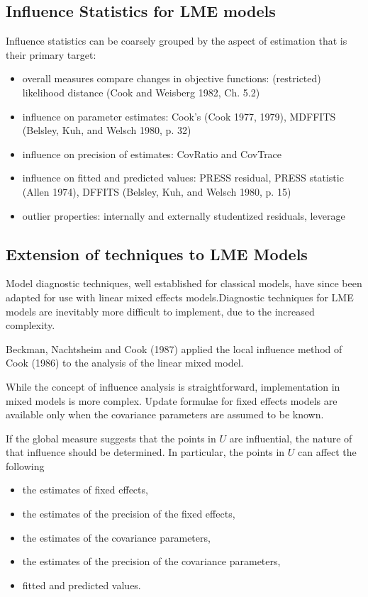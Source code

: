 \documentclass[Main.tex]{subfiles}
\begin{document}
	\subsection{Influence Statistics for LME models} %
	Influence statistics can be coarsely grouped by the aspect of estimation that is their primary target:
	\begin{itemize}
		\item overall measures compare changes in objective functions: (restricted) likelihood distance (Cook and Weisberg 1982, Ch. 5.2)
		\item influence on parameter estimates: Cook's  (Cook 1977, 1979), MDFFITS (Belsley, Kuh, and Welsch 1980, p. 32)
		\item influence on precision of estimates: CovRatio and CovTrace
		\item influence on fitted and predicted values: PRESS residual, PRESS statistic (Allen 1974), DFFITS (Belsley, Kuh, and Welsch 1980, p. 15)
		\item outlier properties: internally and externally studentized residuals, leverage
	\end{itemize}
	
	


\newpage
\subsection{Extension of techniques to LME Models} %


Model diagnostic techniques, well established for classical models, have since been adapted for use with linear mixed effects models.Diagnostic techniques for LME models are inevitably more difficult to implement, due to the increased complexity.


Beckman, Nachtsheim and Cook (1987) \citet{Beckman} applied the local influence method of Cook (1986) to the analysis of the linear mixed model.


While the concept of influence analysis is straightforward, implementation in mixed models is more complex. Update formulae for fixed effects models are available only when the covariance parameters are assumed to be known.


If the global measure suggests that the points in $U$ are influential, the nature of that influence should be determined. In particular, the points in $U$ can affect the following


\begin{itemize}
\item the estimates of fixed effects,
\item the estimates of the precision of the fixed effects,
\item the estimates of the covariance parameters,
\item the estimates of the precision of the covariance parameters,
\item fitted and predicted values.
\end{itemize}
\end{document}
